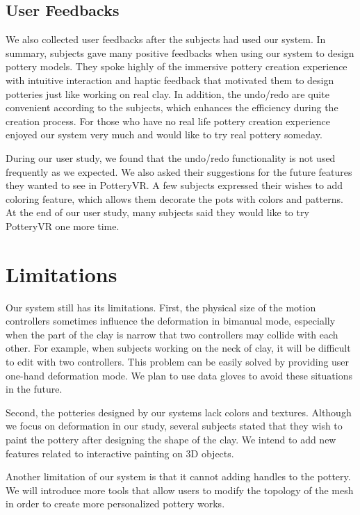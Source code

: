 \documentclass{svjour3}                     %
\begin{document}
\subsection{User Feedbacks}
\label{sec:6.5}

We also collected user feedbacks after the subjects had used our system. In summary, subjects gave many positive feedbacks when using our system to design pottery models. They spoke highly of the immersive pottery creation experience with intuitive interaction and haptic feedback that motivated them to design potteries just like working on real clay. In addition, the undo/redo are quite convenient according to the subjects, which enhances the efficiency during the creation process. For those who have no real life pottery creation experience enjoyed our system very much and would like to try real pottery someday. 

During our user study, we found that the undo/redo functionality is not used frequently as we expected. 
We also asked their suggestions for the future features they wanted to see in PotteryVR.
A few subjects expressed their wishes to add coloring feature, which allows them decorate the pots with colors and patterns.
At the end of our user study, many subjects said they would like to try PotteryVR one more time.

\section{Limitations}
\label{sec:7}

Our system still has its limitations. First, the physical size of the motion controllers sometimes influence the deformation in bimanual mode, especially when the part of the clay is narrow that two controllers may collide with each other. For example, when subjects working on the neck of clay, it will be difficult to edit with two controllers. This problem can be easily solved by providing user one-hand deformation mode. We plan to use data gloves to avoid these situations in the future.

Second, the potteries designed by our systems lack colors and textures. Although we focus on deformation in our study, several subjects stated that they wish to paint the pottery after designing the shape of the clay. We intend to add new features related to interactive painting on 3D objects.

Another limitation of our system is that it cannot adding handles to the pottery. We will introduce more tools that allow users to modify the topology of the mesh in order to create more personalized pottery works.
\end{document}
